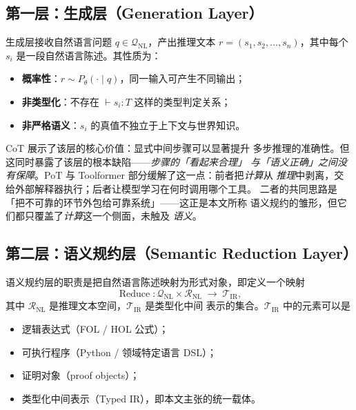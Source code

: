 \documentclass[UTF8,a4paper,11pt]{ctexart}
\newcommand{\NL}{\mathrm{NL}}
\newcommand{\IR}{\mathrm{IR}}
\DeclareMathOperator{\Reduce}{Reduce}
\begin{document}
\subsection{第一层：生成层（Generation Layer）}

生成层接收自然语言问题 $q \in \mathcal{Q}_{\NL}$，产出推理文本
$r = (s_1, s_2, \dots, s_n)$，其中每个 $s_i$ 是一段自然语言陈述。其性质为：
\begin{itemize}[leftmargin=1.6em,itemsep=2pt]
  \item \textbf{概率性}：$r \sim P_\theta(\cdot \mid q)$，同一输入可产生不同输出；
  \item \textbf{非类型化}：不存在 $\vdash s_i : T$ 这样的类型判定关系；
  \item \textbf{非严格语义}：$s_i$ 的真值不独立于上下文与世界知识。
\end{itemize}

CoT \citep{wei2022cot} 展示了该层的核心价值：显式中间步骤可以显著提升
多步推理的准确性。但这同时暴露了该层的根本缺陷——\emph{步骤的「看起来合理」
与「语义正确」之间没有保障}。PoT \citep{chen2023pot} 与 Toolformer
\citep{schick2023toolformer} 部分缓解了这一点：前者把\emph{计算}从
\emph{推理}中剥离，交给外部解释器执行；后者让模型学习在何时调用哪个工具。
二者的共同思路是「把不可靠的环节外包给可靠系统」——这正是本文所称
语义规约的雏形，但它们都只覆盖了\emph{计算}这一个侧面，未触及
\emph{语义}。

\subsection{第二层：语义规约层（Semantic Reduction Layer）}

语义规约层的职责是把自然语言陈述映射为形式对象，即定义一个映射
\begin{equation}\label{eq:reduce}
  \Reduce : \mathcal{Q}_{\NL} \times \mathcal{R}_{\NL}
            \;\longrightarrow\; \mathcal{T}_{\IR},
\end{equation}
其中 $\mathcal{R}_{\NL}$ 是推理文本空间，$\mathcal{T}_{\IR}$ 是类型化中间
表示的集合。$\mathcal{T}_{\IR}$ 中的元素可以是
\begin{itemize}[leftmargin=1.6em,itemsep=2pt]
  \item 逻辑表达式（FOL / HOL 公式）；
  \item 可执行程序（Python / 领域特定语言 DSL）；
  \item 证明对象（proof objects）；
  \item 类型化中间表示（Typed IR），即本文主张的统一载体。
\end{itemize}
\end{document}

